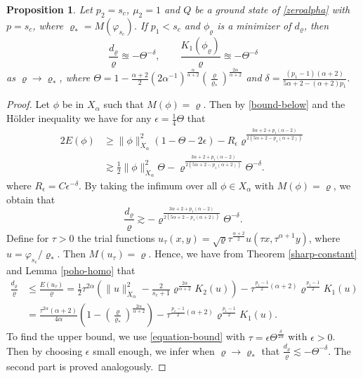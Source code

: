 \documentclass[10pt]{article}
\numberwithin{equation}{section}
\newtheorem{proposition}[theorem]{\quad Proposition}
\newcommand{\ff}{\varphi}
\newcommand{\x}{{X_\alpha}}
\newcommand{\xx}{{\dot{X}_\alpha}}
\newcommand{\moo}{\mu_2}  \newcommand{\poo}{{p_2}}
\newcommand{\vr}{{\varrho}}
\newcommand{\al}{\alpha}
\begin{document}
	\begin{proposition}  
		\label{lem31}
		Let $p_2=s_c$, $\moo=1$ and $Q$ be a ground state of \eqref{zeroalpha} with $p=s_c$, where $\vr_\ast=M(\ff_{s_c})$. If $p_1<s_c$ and $\phi_\vr$ is a minimizer of $d_\vr$, then
		\[
		\frac{d_\vr}{\vr}\approxeq-\varTheta^{-\delta},\qquad\frac{K_1(\phi_\vr)}{\vr}\approxeq-\varTheta^{-\delta}
		\]
		as $\vr\to\vr_\ast$, where $\varTheta=1-\frac{\al+2}{2}(2\al^{-1})^{\frac{\al}{\al+2}}\left(\frac{\varrho}{\varrho_\ast}\right)^\frac{2\al}{\al+2}$ and $\delta=\frac{(p_1-1)(\al+2)}{5\al+2-(\al+2)p_1}$.
	\end{proposition}
	\begin{proof}
		Let $\phi$ be in $\x$ such that $M(\phi)=\vr$. Then by \eqref{bound-below} and the H\"{o}lder inequality we have for any $\epsilon=\frac14\varTheta$ that
		\[
		\begin{split}
			2E(\phi)&\geq
			\|\phi\|_{\xx}^2(1-\varTheta-2\epsilon)-R_\epsilon\vr^{\frac{3\al+2+p_1(\al-2)}{2(5\al+2-p_1(\al+2))}}\\
			&\gtrsim\frac12\|\phi\|_{\xx}^2\varTheta- \vr^{\frac{3\al+2+p_1(\al-2)}{2(5\al+2-p_1(\al+2))}}\varTheta^{-\delta}.
		\end{split}	\]
		where $R_\epsilon=C\epsilon^{-\delta}$. By taking the infimum over all $\phi\in\x$ with $M(\phi)=\vr$, we obtain that
		\[
		\frac{d_\vr}{\vr}\gtrsim-\vr^{\frac{3\al+2+p_1(\al-2)}{2(5\al+2-p_1(\al+2))}}\varTheta^{-\delta}.
		\]
		Define for $\tau>0$ the trial functions $u_\tau(x,y)=\sqrt{\varrho}\tau^{\frac{\al+2}{2}}u(\tau x,\tau^{\al+1}y)$, where $u=\ff_{s_c}/\vr_\ast$. Then $M(u_\tau)=\varrho$. Hence, we have from Theorem \ref{sharp-constant} and Lemma \ref{poho-homo} that
		\begin{equation}\label{equation-bound}
			\begin{split}
				\frac{d_\varrho}{\vr}&\leq\frac{E(u_\tau)}{\vr}
				=
				\frac12\tau^{2\al}\left(\|u\|_\xx^2-\frac{2}{s_c+1}\vr^{\frac{2\al}{\al+2}}K_2(u)\right)-\tau^{\frac{p_1-1}{2}(\al+2)}\vr^{\frac{p_1-1}{2}}K_1(u)\\
				&=\frac{\tau^{2\al}(\al+2)}{4\al}\left(1-\left(\frac{\varrho}{\varrho_\ast}\right)^\frac{2\al}{\al+2}\right)
				-\tau^{\frac{p_1-1}{2}(\al+2)}\vr^{\frac{p_1-1}{2}}K_1(u).
			\end{split}
		\end{equation}
		To find the upper bound, we use \eqref{equation-bound} with $\tau=\epsilon\varTheta^{\frac{\delta}{2\al}}$ with $\epsilon>0$. Then by choosing $\epsilon$ small enough, we infer when $\vr\to\vr_\ast$ that $\frac{d_\vr}{\vr}\lesssim- \varTheta^{-\delta}.$ The second part is proved analogously.
	\end{proof}
\end{document}
